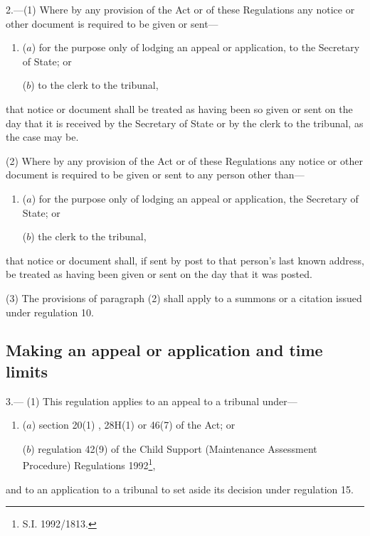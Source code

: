 \documentclass[12pt,a4paper]{article}
\begin{document}
2.—(1) Where by any provision of the Act or of these Regulations any notice or other document is required to be given or sent—
\begin{enumerate}\item[]
($a$) for the purpose only of lodging an appeal or application, to the Secretary of State; or

($b$) to the clerk to the tribunal,
\end{enumerate}
that notice or document shall be treated as having been so given or sent on the day that it is received by the Secretary of State or by the clerk to the tribunal, as the case may be.

(2) Where by any provision of the Act or of these Regulations any notice or other document is required to be given or sent to any person other than—
\begin{enumerate}\item[]
($a$) for the purpose only of lodging an appeal or application, the Secretary of State; or

($b$) the clerk to the tribunal,
\end{enumerate}
that notice or document shall, if sent by post to that person’s last known address, be treated as having been given or sent on the day that it was posted.

(3) The provisions of paragraph (2) shall apply to a summons or a citation issued under regulation 10.


\subsection[3. Making an appeal or application and time limits]{Making an appeal or application and time limits}

3.—%
(1) This regulation applies to an appeal to a tribunal under—
\begin{enumerate}\item[]
($a$) section 20(1)%
, 28H(1)  %
or 46(7) of the Act; or

($b$) regulation 42(9) of the Child Support (Maintenance Assessment Procedure) Regulations 1992\footnote{\frenchspacing S.I. 1992/1813.},
\end{enumerate}
and to an application to a tribunal to set aside its decision under regulation 15.
\end{document}
